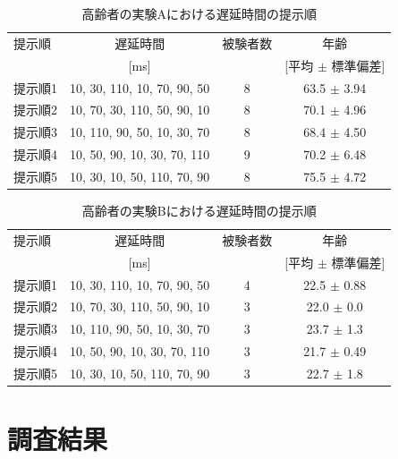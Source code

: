 \begin{table}[btp]
  \caption{高齢者の実験Aにおける遅延時間の提示順}
  \label{table:old_a}
  \centering
  \begin{tabular}{lccc}
    \hline
    提示順 & 遅延時間 & 被験者数 & 年齢\\
    　& [ms] & & [平均 $\pm$ 標準偏差]\\
    \hline \hline
    提示順1  & 10, 30, 110, 10, 70, 90, 50  & 8 & 63.5 $\pm$ 3.94\\
    提示順2  & 10, 70, 30, 110, 50, 90, 10  & 8 & 70.1 $\pm$ 4.96\\
    提示順3  & 10, 110, 90, 50, 10, 30, 70  & 8 & 68.4 $\pm$ 4.50\\
    提示順4  & 10, 50, 90, 10, 30, 70, 110  & 9 & 70.2 $\pm$ 6.48\\
    提示順5  & 10, 30, 10, 50, 110, 70, 90  & 8 & 75.5 $\pm$ 4.72
\\
    \hline
  \end{tabular}
\end{table}
\begin{table}[btp]
  \caption{高齢者の実験Bにおける遅延時間の提示順}
  \label{table:old_b}
  \centering
  \begin{tabular}{lccc}
    \hline
    提示順 & 遅延時間 & 被験者数 & 年齢\\
    　& [ms] & & [平均 $\pm$ 標準偏差]\\
    \hline \hline
    提示順1  & 10, 30, 110, 10, 70, 90, 50  & 4 & 22.5 $\pm$ 0.88\\
    提示順2  & 10, 70, 30, 110, 50, 90, 10  & 3 & 22.0 $\pm$ 0.0\\
    提示順3  & 10, 110, 90, 50, 10, 30, 70  & 3 & 23.7 $\pm$ 1.3\\
    提示順4  & 10, 50, 90, 10, 30, 70, 110  & 3 & 21.7 $\pm$ 0.49\\
    提示順5  & 10, 30, 10, 50, 110, 70, 90  & 3 & 22.7 $\pm$ 1.8
\\
    \hline
  \end{tabular}
\end{table}
\newpage
\section{調査結果}
